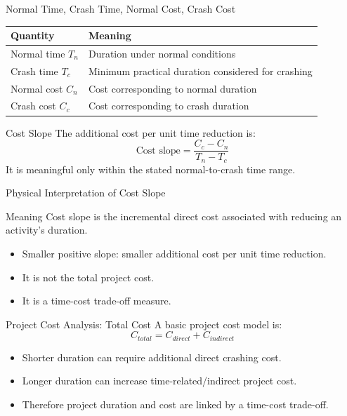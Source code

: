 \documentclass[aspectratio=169,10pt]{beamer}
\begin{document}
\begin{frame}{Normal Time, Crash Time, Normal Cost, Crash Cost}
\centering
\begin{tabular}{l|l}
\toprule
Quantity & Meaning\\
\midrule
Normal time $T_n$ & Duration under normal conditions\\
Crash time $T_c$ & Minimum practical duration considered for crashing\\
Normal cost $C_n$ & Cost corresponding to normal duration\\
Crash cost $C_c$ & Cost corresponding to crash duration\\
\bottomrule
\end{tabular}
\end{frame}

\begin{frame}{Cost Slope}
The additional cost per unit time reduction is:
\[
\boxed{\text{Cost slope}=\frac{C_c-C_n}{T_n-T_c}}
\]
\vspace{0.2cm}
It is meaningful only within the stated normal-to-crash time range.
\end{frame}

\begin{frame}{Physical Interpretation of Cost Slope}
\begin{block}{Meaning}
Cost slope is the incremental direct cost associated with reducing an activity's duration.
\end{block}
\begin{itemize}
  \item Smaller positive slope: smaller additional cost per unit time reduction.
  \item It is not the total project cost.
  \item It is a time-cost trade-off measure.
\end{itemize}
\end{frame}

\begin{frame}{Project Cost Analysis: Total Cost}
A basic project cost model is:
\[
\boxed{C_{total}=C_{direct}+C_{indirect}}
\]
\begin{itemize}
  \item Shorter duration can require additional direct crashing cost.
  \item Longer duration can increase time-related/indirect project cost.
  \item Therefore project duration and cost are linked by a time-cost trade-off.
\end{itemize}
\end{frame}
\end{document}
